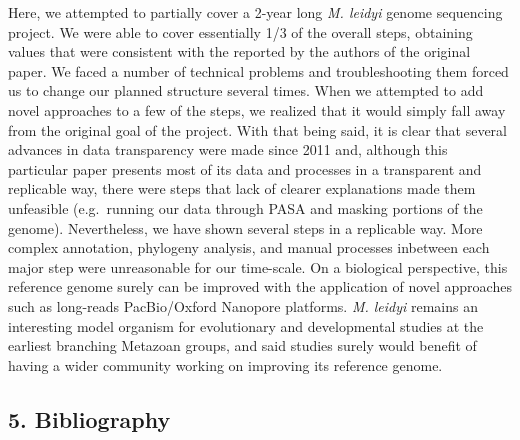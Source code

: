 \documentclass[
]{article}
\begin{document}
Here, we attempted to partially cover a 2-year long \emph{M. leidyi}
genome sequencing project. We were able to cover essentially 1/3 of the
overall steps, obtaining values that were consistent with the reported
by the authors of the original paper. We faced a number of technical
problems and troubleshooting them forced us to change our planned
structure several times. When we attempted to add novel approaches to a
few of the steps, we realized that it would simply fall away from the
original goal of the project. With that being said, it is clear that
several advances in data transparency were made since 2011 and, although
this particular paper presents most of its data and processes in a
transparent and replicable way, there were steps that lack of clearer
explanations made them unfeasible (e.g.~running our data through PASA
and masking portions of the genome). Nevertheless, we have shown several
steps in a replicable way. More complex annotation, phylogeny analysis,
and manual processes inbetween each major step were unreasonable for our
time-scale. On a biological perspective, this reference genome surely
can be improved with the application of novel approaches such as
long-reads PacBio/Oxford Nanopore platforms. \emph{M. leidyi} remains an
interesting model organism for evolutionary and developmental studies at
the earliest branching Metazoan groups, and said studies surely would
benefit of having a wider community working on improving its reference
genome.

\hypertarget{bibliography}{%
\subsection{5. Bibliography}\label{bibliography}}
\end{document}

